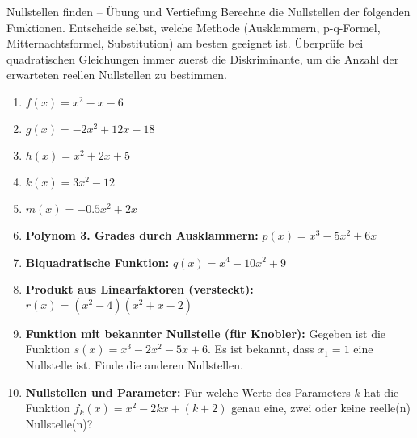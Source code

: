 \begin{aufgabenumgebung}{Nullstellen finden – Übung und Vertiefung}
Berechne die Nullstellen der folgenden Funktionen. Entscheide selbst, welche Methode (Ausklammern, p-q-Formel, Mitternachtsformel, Substitution) am besten geeignet ist. Überprüfe bei quadratischen Gleichungen immer zuerst die Diskriminante, um die Anzahl der erwarteten reellen Nullstellen zu bestimmen.
\begin{enumerate}
    \item $f(x) = x^2 - x - 6$


    \item $g(x) = -2x^2 + 12x - 18$ 


    \item $h(x) = x^2 + 2x + 5$


    \item $k(x) = 3x^2 - 12$ 


    \item $m(x) = -0.5x^2 + 2x$


    \item \textbf{Polynom 3. Grades durch Ausklammern:}
        $p(x) = x^3 - 5x^2 + 6x$


    \item \textbf{Biquadratische Funktion:}
        $q(x) = x^4 - 10x^2 + 9$


    \item \textbf{Produkt aus Linearfaktoren (versteckt):}
        $r(x) = (x^2-4)(x^2+x-2)$


    \item \textbf{Funktion mit bekannter Nullstelle (für Knobler):}
        Gegeben ist die Funktion $s(x) = x^3 - 2x^2 - 5x + 6$. Es ist bekannt, dass $x_1=1$ eine Nullstelle ist. Finde die anderen Nullstellen.



    \item \textbf{Nullstellen und Parameter:}
        Für welche Werte des Parameters $k$ hat die Funktion $f_k(x) = x^2 - 2kx + (k+2)$ genau eine, zwei oder keine reelle(n) Nullstelle(n)?


\end{enumerate}
\end{aufgabenumgebung}


